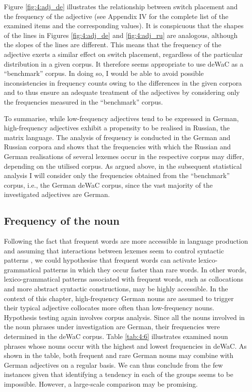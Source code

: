 Figure \ref{fig:4:adj_de} illustrates the relationship between switch placement and the frequency of the adjective (see Appendix IV for the complete list of the examined items and the corresponding values). It is conspicuous that the shapes of the lines in Figures \ref{fig:4:adj_de} and \ref{fig:4:adj_ru} are analogous, although the slopes of the lines are different. This means that the frequency of the adjective exerts a similar effect on switch placement, regardless of the particular distribution in a given corpus. It therefore seems appropriate to use deWaC as a “benchmark” corpus. In doing so, I would be able to avoid possible inconsistencies in frequency counts owing to the differences in the given corpora and to thus ensure an adequate treatment of the adjectives by considering only the frequencies measured in the “benchmark” corpus.

To summarise, while low-frequency adjectives tend to be expressed in German, high-frequency adjectives exhibit a propensity to be realised in Russian, the matrix language. The analysis of frequency is conducted in the German and Russian corpora and shows that the frequencies with which the Russian and German realisations of several lexemes occur in the respective corpus may differ, depending on the utilised corpus. As argued above, in the subsequent statistical analysis I will consider only the frequencies obtained from the “benchmark” corpus, i.e., the German deWaC corpus, since the vast majority of the investigated adjectives are German.

\subsection{Frequency of the noun}

Following the fact that frequent words are more accessible in language production and assuming that interactions between lexemes seem to control syntactic patterns \citep[][115]{macwhinney1997}, we could hypothesise that frequent words can activate lexico-grammatical patterns in which they occur faster than rare words. In other words, lexico-grammatical patterns associated with frequent words, such as collocations and more abstract syntactic constructions, may be highly accessible. In the context of this chapter, high-frequency German nouns are assumed to trigger their typical adjective collocates more often than low-frequency nouns. Hypothesis testing again involves corpus analysis. Since all the nouns involved in the noun phrases under investigation are German, their frequencies were determined in the deWaC corpus. Table \ref{tab:4:6} illustrates examined noun phrases whose nouns occur with the highest and lowest frequencies in deWaC. As shown in the table, both frequent and rare German nouns may combine with German adjectives on a regular basis. We can thus conclude from the few instances given that identifying a tendency in each of the groups seems to be impossible. However, a large-scale comparison may be promising.

